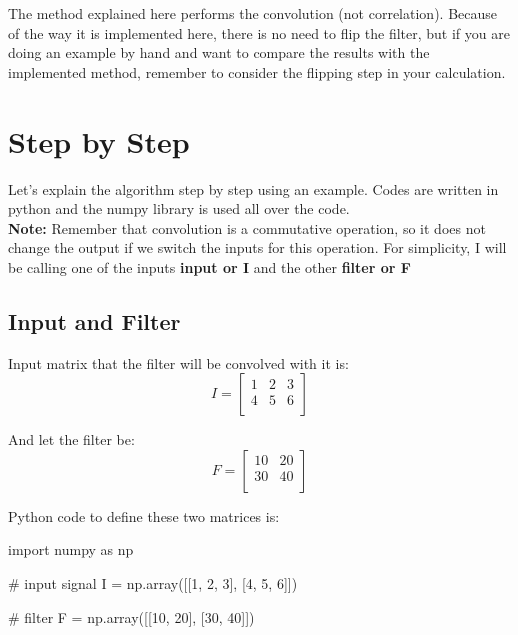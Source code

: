 \documentclass[11pt]{article}
\begin{document}
	The method explained here performs the convolution (not correlation). Because of the way it is implemented here, there is no need to flip the filter, but if you are doing an example by hand and want to compare the results with the implemented method, remember to consider the flipping step in your calculation.
	
	
	
	\section{Step by Step}
	Let's explain the algorithm step by step using an example. Codes are written in python and the numpy library is used all over the code.\\
	
	\textbf{Note:} Remember that convolution is a commutative operation, so it does not change the output if we switch the inputs for this operation. For simplicity, I will be calling one of the inputs \textbf{input or I} and the other \textbf{filter or F}
	
	\subsection{Input and Filter}
	Input matrix that the filter will be convolved with it is:
	\begin{equation}
	I = 
	\begin{bmatrix}
	1 & 2 & 3 \\
	4 & 5 & 6 \\
	\end{bmatrix}
	\end{equation}
	
	And let the filter be:
	\begin{equation}
	F = 
	\begin{bmatrix}
	10 & 20 \\
	30 & 40 \\
	\end{bmatrix}
	\end{equation}
	
	Python code to define these two matrices is:
	\vspace{10mm}
	\begin{python}
		import numpy as np
		
		# input signal
		I = np.array([[1, 2, 3], [4, 5, 6]])
		
		# filter 
		F = np.array([[10, 20], [30, 40]])           
	\end{python}
	\vspace{10mm}
	
\end{document}
